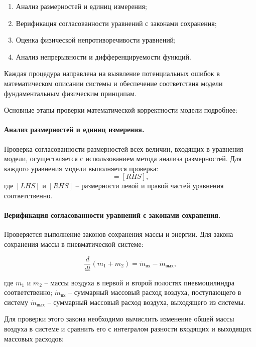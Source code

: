 \begin{enumerate}
    \item Анализ размерностей и единиц измерения;
    \item Верификация согласованности уравнений с законами сохранения;
    \item Оценка физической непротиворечивости уравнений;
    \item Анализ непрерывности и дифференцируемости функций.
\end{enumerate}

Каждая процедура направлена на выявление потенциальных ошибок в математическом описании
системы и обеспечение соответствия модели фундаментальным физическим принципам.

Основные этапы проверки математической корректности модели подробнее:

\paragraph{Анализ размерностей и единиц измерения.}

Проверка согласованности размерностей всех величин, входящих в уравнения модели, осуществляется с использованием метода анализа размерностей. Для каждого уравнения модели выполняется проверка:
\begin{equation*}
    [LHS] = [RHS],
\end{equation*}
где $[LHS]$ и $[RHS]$ -- размерности левой и правой частей уравнения соответственно.

\paragraph{Верификация согласованности уравнений с законами сохранения.}

Проверяется выполнение законов сохранения массы и энергии. Для закона сохранения массы в пневматической системе:

\begin{equation*}
    \frac{d}{dt}(m_1 + m_2) = \dot{m}_\text{вх} - \dot{m}_\text{вых},
\end{equation*}

где $m_1$ и $m_2$ -- массы воздуха в первой и второй полостях пневмоцилиндра соответственно;
$\dot{m}_\text{вх}$ -- суммарный массовый расход воздуха, поступающего в систему
$\dot{m}_\text{вых}$ -- суммарный массовый расход воздуха, выходящего из системы.

Для проверки этого закона необходимо вычислить изменение общей массы воздуха в системе и сравнить
его с интегралом разности входящих и выходящих массовых расходов:

